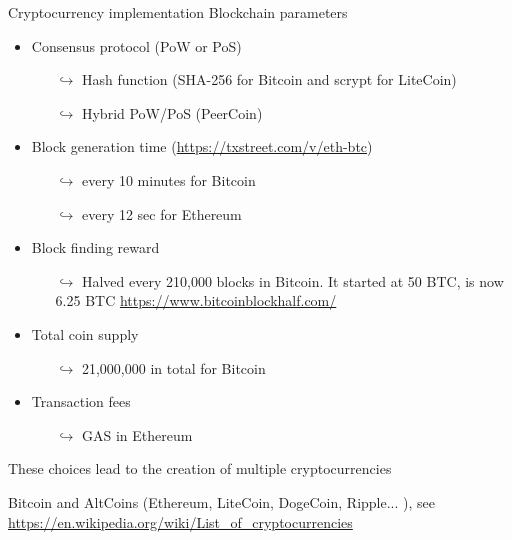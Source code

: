 \documentclass{beamer}
\begin{document}
\begin{frame}{Cryptocurrency implementation}
\scriptsize
Blockchain parameters
\begin{itemize}
  \item Consensus protocol (PoW or PoS) 
  \begin{itemize}
    \item[$\hookrightarrow$] \tiny{Hash function (SHA-256 for Bitcoin and scrypt for LiteCoin)}
    \item[$\hookrightarrow$] \tiny{Hybrid PoW/PoS (PeerCoin)}
  \end{itemize}
  \item Block generation time (\url{https://txstreet.com/v/eth-btc}) \scriptsize
    \begin{itemize}
    \item[$\hookrightarrow$] \tiny{every 10 minutes for Bitcoin} 
    \item[$\hookrightarrow$] \tiny{every 12 sec for Ethereum} 
  \end{itemize}
  \item Block finding reward\scriptsize
  \begin{itemize}
    \item[$\hookrightarrow$] \tiny Halved every 210,000 blocks in Bitcoin. It started at 50 BTC, is now 6.25 BTC \url{https://www.bitcoinblockhalf.com/}
  \end{itemize}
  \item Total coin supply\scriptsize
    \begin{itemize}
    \item[$\hookrightarrow$] \tiny 21,000,000 in total for Bitcoin
  \end{itemize}
  \item Transaction fees\scriptsize
      \begin{itemize}
    \item[$\hookrightarrow$] \tiny GAS in Ethereum
  \end{itemize}
\end{itemize}
These choices lead to the creation of multiple cryptocurrencies 
\begin{tcolorbox}[enhanced,drop shadow, title=Examples]
     Bitcoin and AltCoins (Ethereum, LiteCoin, DogeCoin, Ripple... ), see \url{https://en.wikipedia.org/wiki/List_of_cryptocurrencies}
\end{tcolorbox}

\end{frame}
\end{document}

